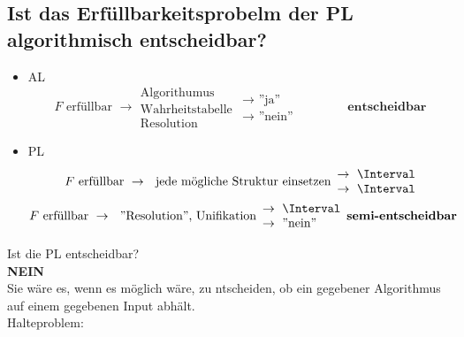 \subsection{Ist das Erfüllbarkeitsprobelm der PL algorithmisch entscheidbar?}
\begin{itemize}
	\item AL \\
		\[
			F \text{ erfüllbar } \rightarrow \begin{array}{l}
				\text{Algorithumus}		\\
				\text{Wahrheitstabelle}	\\
				\text{Resolution}			
			\end{array} \begin{array}{l}
				\rightarrow \text{ ''ja''}		\\
				\rightarrow \text{ ''nein''}	
			\end{array} \qquad \qquad \textbf{entscheidbar}
		\]
	\item PL \\
	\begin{gather*}
		F \text{ erfüllbar } \rightarrow \text{ jede mögliche Struktur einsetzen} \begin{array}{l}
			\rightarrow \text{\Interval} \\
			\rightarrow \text{\Interval}
		\end{array} \\
		F \text{ erfüllbar } \rightarrow \text{ ''Resolution'', Unifikation} \begin{array}{l}
			\rightarrow \text{\Interval} \\
			\rightarrow \text{''nein''}
		\end{array} \textbf{semi-entscheidbar}
	\end{gather*}
\end{itemize}
Ist die PL entscheidbar? \\
\textbf{NEIN}\\
Sie wäre es, wenn es möglich wäre, zu ntscheiden, ob ein gegebener Algorithmus auf einem gegebenen Input abhält.\\
Halteproblem:
